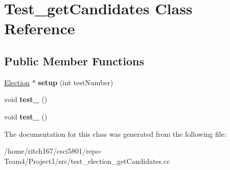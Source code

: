 \hypertarget{classTest__getCandidates}{}\section{Test\+\_\+get\+Candidates Class Reference}
\label{classTest__getCandidates}
\subsection*{Public Member Functions}
\begin{DoxyCompactItemize}
\item 
\mbox{\label{classTest__getCandidates_add3988f8aea7c036da778a6e490f7773}} 
\hyperlink{classElection}{Election} $\ast$ {\bfseries setup} (int test\+Number)
\item 
\mbox{\label{classTest__getCandidates_aeed6fc54a4c5dae61de70ffdbd780aa2}} 
void {\bfseries test\+\_} ()
\item 
\mbox{\label{classTest__getCandidates_a2aaed47b89aaa058698e9018b4777855}} 
void {\bfseries test\+\_} ()
\end{DoxyCompactItemize}


The documentation for this class was generated from the following file\+:\begin{DoxyCompactItemize}
\item 
/home/ritch167/csci5801/repo-\/\+Team4/\+Project1/src/test\+\_\+election\+\_\+get\+Candidates.\+cc\end{DoxyCompactItemize}
